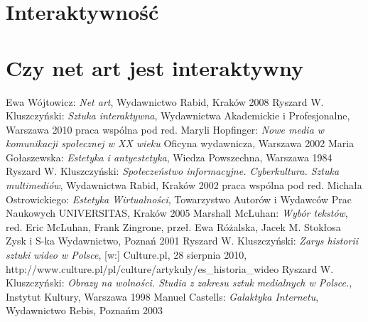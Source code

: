 \documentclass[a4paper,12pt,twoside]{article}
\begin{document}
\section{Interaktywność}

\section{Czy net art jest interaktywny}


\begin{thebibliography}{6}
  Ewa Wójtowicz:
  \textit{Net art},
  Wydawnictwo Rabid, Kraków 2008
  Ryszard W. Kluszczyński:
  \textit{Sztuka interaktywna},
  Wydawnictwa Akademickie i Profesjonalne,
  Warszawa 2010
  praca wspólna pod red. Maryli Hopfinger:
  \textit{Nowe media w komunikacji społecznej w XX wieku}
  Oficyna wydawnicza,
  Warszawa 2002
  Maria Gołaszewska:
  \textit{Estetyka i antyestetyka},
  Wiedza Powszechna, Warszawa 1984
  Ryszard W. Kluszczyński:
  \textit{Społeczeństwo informacyjne. Cyberkultura. Sztuka multimediów},
  Wydawnictwa Rabid, Kraków 2002
  praca wspólna pod red. Michała Ostrowickiego:
  \textit{Estetyka Wirtualności},
  Towarzystwo Autorów i Wydawców Prac Naukowych UNIVERSITAS,
  Kraków 2005
  Marshall McLuhan:
  \textit{Wybór tekstów},
  red. Eric McLuhan, Frank Zingrone,
  przeł. Ewa Różalska, Jacek M. Stokłosa
  Zysk i S-ka Wydawnictwo, Poznań 2001
  Ryszard W. Kluszczyński:
  \textit{Zarys historii sztuki wideo w Polsce},
  [w:] Culture.pl, 28 sierpnia 2010,
  http://www.culture.pl/pl/culture/artykuly/es\_historia\_wideo
  Ryszard W. Kluszczyński:
  \textit{Obrazy na wolności. Studia z zakresu sztuk medialnych w Polsce.},
  Instytut Kultury, Warszawa 1998
  Manuel Castells:
  \textit{Galaktyka Internetu},
  Wydawnictwo Rebis, Poznańm 2003

\end{thebibliography}
\end{document}
